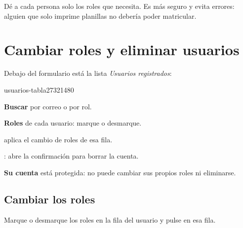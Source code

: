 \begin{pasos}
\end{pasos}

\begin{consejo}
Dé a cada persona solo los roles que necesita. Es más seguro y evita errores: alguien que solo
imprime planillas no debería poder matricular.
\end{consejo}

\section{Cambiar roles y eliminar usuarios}

Debajo del formulario está la lista \emph{Usuarios registrados}:

\begin{captura}{usuarios-tabla}{2732}{1480}
\end{captura}

\begin{leyenda}
  \item[1] \textbf{Buscar} por correo o por rol.
  \item[2] \textbf{Roles} de cada usuario: marque o desmarque.
  \item[3]  aplica el cambio de roles de esa fila.
  \item[4] : abre la confirmación para borrar la cuenta.
  \item[5] \textbf{Su cuenta} está protegida: no puede cambiar sus propios roles ni eliminarse.
\end{leyenda}

\subsection{Cambiar los roles}

Marque o desmarque los roles en la fila del usuario y pulse  en esa fila.

